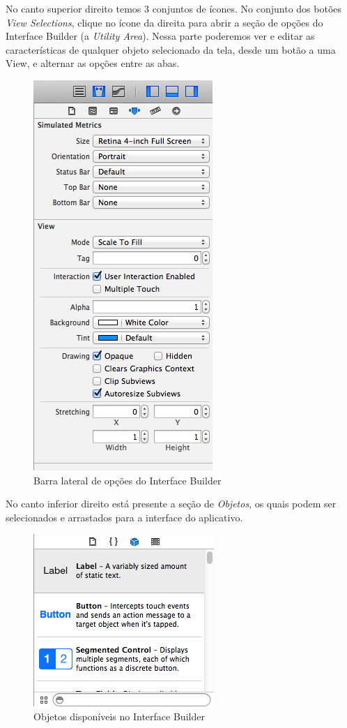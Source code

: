 \documentclass[a4paper,12pt,brazil,doubleside]{book}
\begin{document}
\begin{singlespace}
No canto superior direito temos 3 conjuntos de ícones. No conjunto dos botões \emph{View Selections}, clique no ícone da direita para abrir a seção de opções do Interface Builder (a \emph{Utility Area}). Nessa parte poderemos ver e editar as características de qualquer objeto selecionado da tela, desde um botão a uma View, e alternar as opções entre as abas.

\begin{figure}[H]
  \centering
  \includegraphics[scale=0.5]{figuras/3/tela_novo_projeto_11.png}
  \caption{Barra lateral de opções do Interface Builder}
  \label{fig:a}
\end{figure}


No canto inferior direito está presente a seção de \emph{Objetos}, os quais podem ser selecionados e arrastados para a interface do aplicativo.

\begin{figure}[H]
  \centering
  \includegraphics[scale=0.5]{figuras/3/tela_novo_projeto_12.png}
  \caption{Objetos disponíveis no Interface Builder}
  \label{fig:a}
\end{figure}


\end{singlespace}
\end{document}
